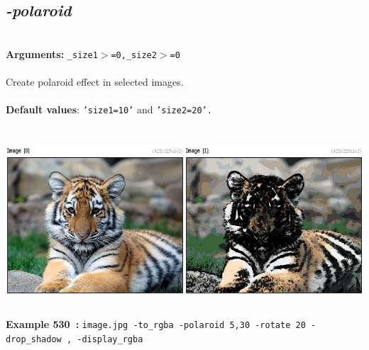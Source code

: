 \documentclass[a4paper,11pt,twoside]{book}
\begin{document}
\subsection{\emph{-polaroid} }\vspace*{-0.5em}
~\\\textbf{Arguments: } 
{\small \texttt{\_size1$>$=0,\_size2$>$=0}}\\~\\
Create polaroid effect in selected images.
~\\~\\\textbf{Default values}: {\small \texttt{'size1=10'} and \texttt{'size2=20'.}}
\begin{center}\includegraphics[keepaspectratio=true,height=7cm,width=\textwidth]{img/gmic_def530.jpg}\\
{\footnotesize \textbf{Example 530~:} \texttt{image.jpg -to\_rgba -polaroid 5,30 -rotate 20 -drop\_shadow , -display\_rgba}}
\end{center}
\end{document}
